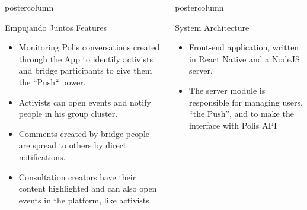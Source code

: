 \documentclass[final,hyperref={pdfpagelabels=false}]{beamer}
\newlength{\columnheight}
\begin{document}
\begin{frame}
\begin{columns}
\begin{column}{.49\textwidth}
\begin{beamercolorbox}[center,wd=\textwidth]{postercolumn}
\begin{minipage}[T]{.95\textwidth}
{\begin{block}{Empujando Juntos Features}
\begin{itemize}
    \item Monitoring Polis conversations created through the App
    to identify activists and bridge participants to give them the ``Push``
    power.

    \item Activists can open events and notify people in his group cluster.

    \item Comments created by bridge people are spread to others by direct
    notifications.

    \item Consultation creators have their content highlighted and can also open
    events in the platform, like activists
  \end{itemize}
\end{block}

}
\end{minipage}
\end{beamercolorbox}
\end{column}

\begin{column}{.49\textwidth}
  \begin{beamercolorbox}[center,wd=\textwidth]{postercolumn}
    \begin{minipage}[T]{.95\textwidth} %
      \parbox[t][\columnheight]{\textwidth}{ %

\begin{block}{System Architecture}
	\begin{itemize}
    \item Front-end application, written in React Native
    and a NodeJS server.

    \item The server module is responsible for managing users, ``the Push'', and
    to make the interface with Polis API
  \end{itemize}


\end{block}}
\end{minipage}
\end{beamercolorbox}
\end{column}
\end{columns}
\end{frame}
\end{document}
